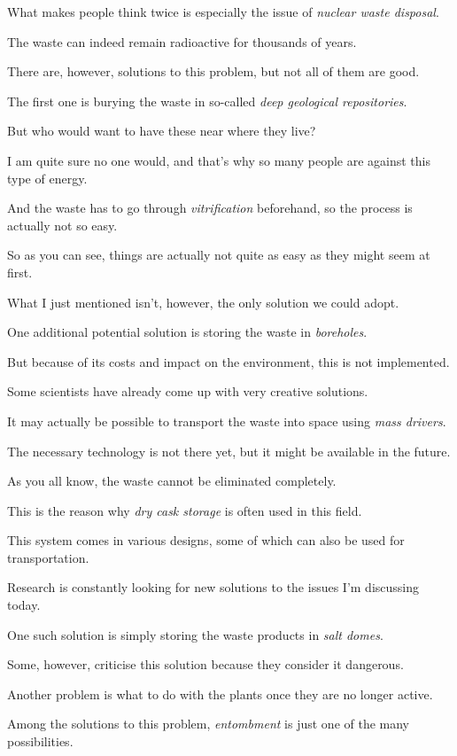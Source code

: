 What makes people think twice is especially the issue of \textit{nuclear waste disposal}.

The waste can indeed remain radioactive for thousands of years.

\ex There are, however, solutions to this problem, but not all of them are good.

The first one is burying the waste in so-called \textit{deep geological repositories}.

But who would want to have these near where they live?

\ex I am quite sure no one would, and that's why so many people are against this type of energy.

And the waste has to go through \textit{vitrification} beforehand, so the process is actually not so easy.

So as you can see, things are actually not quite as easy as they might seem at first.

\ex What I just mentioned isn't, however, the only solution we could adopt.

One additional potential solution is storing the waste in \textit{boreholes}.

But because of its costs and impact on the environment, this is not implemented.

\ex Some scientists have already come up with very creative solutions.

It may actually be possible to transport the waste into space using \textit{mass drivers}.

The necessary technology is not there yet, but it might be available in the future.

\ex As you all know, the waste cannot be eliminated completely.

This is the reason why \textit{dry cask storage} is often used in this field.

This system comes in various designs, some of which can also be used for transportation.

\ex Research is constantly looking for new solutions to the issues I'm discussing today.

One such solution is simply storing the waste products in \textit{salt domes}.

Some, however, criticise this solution because they consider it dangerous.

\ex Another problem is what to do with the plants once they are no longer active.

Among the solutions to this problem, \textit{entombment} is just one of the many possibilities.

